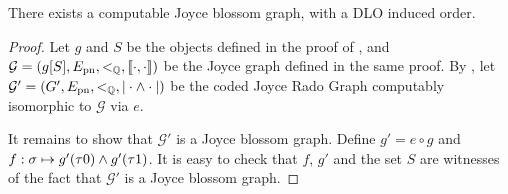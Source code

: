 \begin{comment}
\begin{definition}\label{def:blossom-rado-tree}
A \emph{Joyce blossom graph} is a graph $(g[S],\Epn)$ where $S$ is a cofinal set with $\forall\sigma,\tau\in\meetclosure S$, $\sigma|\neq|\tau|$ and $g$ is part of a blossom tree $(f, g)$
such that 
$$
\forall \sigma, \rho \in 2^\ell \mbox{, } f(\rho 0)(|g(\sigma)|) \neq f(\rho 1)(|g(\sigma)|)
$$
\end{definition}
\pelliot{Make figures for these definitions}


\end{comment}
\begin{lemma}\label{le:computable-bjrg}
  There exists a computable Joyce blossom graph, with a DLO induced order.
\end{lemma}
\begin{proof}
  Let $g$ and $S$ be the objects defined in the proof of , and $\mathcal{G} =(g[S],E_{\mathrm{pn}},<_{\mathbb{Q}},\llbracket \cdot , \cdot \rrbracket)$ be the Joyce graph defined in the same proof. By , let $\mathcal{G}'=(G',E_{\mathrm{pn}},<_{\mathbb{Q}}, |\cdot\wedge\cdot|)$ be the coded Joyce Rado Graph computably isomorphic to $\mathcal{G}$ via $e$.%

  It remains to show that $\mathcal{G}'$ is a Joyce blossom graph. %
  Define $g'=e\circ g$ and $f:\sigma\mapsto g'(\tau0)\wedge g'(\tau1)$. It is easy to check that  $f$, $g'$ and the set $S$ are witnesses of the fact that $\mathcal{G}'$ is a Joyce blossom graph.%
\end{proof}


